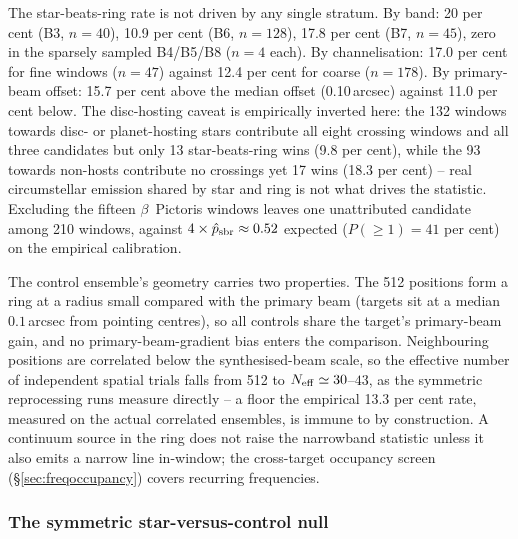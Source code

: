 \documentclass{openjournal}
\begin{document}
The star-beats-ring rate is not driven by any single stratum. By
band: 20 per cent (B3, $n=40$), 10.9 per cent (B6, $n=128$), 17.8 per
cent (B7, $n=45$), zero in the sparsely sampled B4/B5/B8 ($n=4$
each). By channelisation: 17.0 per cent for fine windows ($n=47$)
against 12.4 per cent for coarse ($n=178$). By primary-beam offset:
15.7 per cent above the median offset (0.10\,arcsec) against 11.0 per
cent below. The disc-hosting caveat is empirically inverted here: the
132 windows towards disc- or planet-hosting stars contribute all
eight crossing windows and all three candidates but only 13
star-beats-ring wins (9.8 per cent), while the 93 towards non-hosts
contribute no crossings yet 17 wins (18.3 per cent) -- real
circumstellar emission shared by star and ring is not what drives the
statistic. Excluding the fifteen $\beta$~Pictoris windows leaves one
unattributed candidate among 210 windows, against
$4\times\hat{p}_{\rm sbr}\approx0.52$ expected ($P(\geq1)=41$ per
cent) on the empirical calibration.

The control ensemble's geometry carries two properties. The 512
positions form a ring at a radius small compared with the primary
beam (targets sit at a median $0.1$\,arcsec from pointing centres),
so all controls share the target's primary-beam gain, and no
primary-beam-gradient bias enters the comparison. Neighbouring
positions are correlated below the synthesised-beam scale, so the
effective number of independent spatial trials falls from 512 to
$N_{\rm eff}\simeq30$--$43$, as the symmetric reprocessing runs
measure directly -- a floor the empirical 13.3 per cent rate,
measured on the actual correlated ensembles, is immune to by
construction. A continuum source in the ring does not raise the
narrowband statistic unless it also emits a narrow line in-window;
the cross-target occupancy screen (\S\ref{sec:freqoccupancy}) covers
recurring frequencies.

\subsubsection*{The symmetric star-versus-control null}
\end{document}
